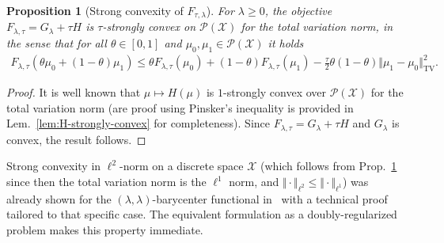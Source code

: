 \documentclass[11pt]{article}
\newcommand{\rev}[1]{{#1}}
\newcommand{\Pp}{\mathcal{P}}
\newcommand{\Xx}{\mathcal{X}}
\newcommand{\TV}{\mathrm{TV}}
\newtheorem{proposition}[theorem]{Proposition}
\begin{document}
\begin{proposition}[Strong convexity of $F_{\tau,\lambda}$]\label{prop:strong-convexity}
For $\lambda\geq 0$, the objective $F_{\lambda,\tau}=G_\lambda+\tau H$ is $\tau$-strongly convex on $\Pp(\Xx)$ for the total variation norm, \rev{in the sense that for all $\theta \in [0,1]$ and $\mu_0,\mu_1\in \Pp(\Xx)$ it holds 
\begin{align*}
F_{\lambda,\tau}(\theta\mu_0+(1-\theta)\mu_1) \leq \theta F_{\lambda,\tau}(\mu_0) + (1-\theta)F_{\lambda,\tau}(\mu_1)-\frac{\tau}{2}\theta(1-\theta)\Vert \mu_1-\mu_0\Vert_{\TV}^2.
\end{align*}}
\end{proposition}
\begin{proof}
It is well known that $\mu\mapsto H(\mu)$ is $1$-strongly convex over $\Pp(\Xx)$ for the total variation norm (are proof using Pinsker's inequality is provided in Lem.~\ref{lem:H-strongly-convex} for completeness). %
Since $F_{\lambda,\tau}=G_\lambda+\tau H$ and $G_\lambda$ is convex, the result follows. 
\end{proof}
Strong convexity in $\ell^2$-norm on a discrete space $\Xx$ (which follows from Prop.~\ref{prop:strong-convexity} since then the total variation norm is the $\ell^1$ norm, and $\Vert \cdot \Vert_{\ell^2}\leq \Vert \cdot \Vert_{\ell^1}$) was already shown for the $(\lambda,\lambda)$-barycenter functional in~\cite[Thm.~3.4]{bigot2019data} with a technical proof tailored to that specific case. The equivalent formulation as a doubly-regularized problem makes this property immediate.
\end{document}
